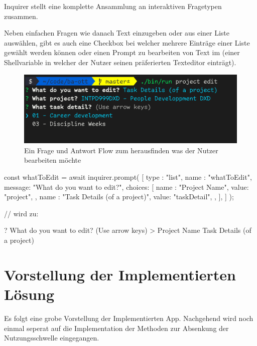 \documentclass[oneside,bibliography=totocnumbered,BCOR=5mm]{scrbook}
\newenvironment{code}{\captionsetup{type=listing, skip=0pt}}{}
\begin{document}
Inquirer stellt eine komplette Ansammlung an interaktiven %
Fragetypen zusammen.

Neben einfachen Fragen wie danach Text einzugeben oder aus einer Liste
auswählen, gibt es auch eine Checkbox bei welcher mehrere Einträge einer
Liste gewählt werden können oder einen Prompt zu bearbeiten von Text im
 (einer Shellvariable in welcher der Nutzer seinen
präferierten Texteditor einträgt).

\begin{figure}
  \centering
  \includegraphics[scale=0.5]{inquirer-example.png}
  \caption{Ein Frage und Antwort Flow zum herausfinden was der Nutzer bearbeiten möchte}
  \label{fig:inquirer-example}
\end{figure}

\begin{code}
  \medskip
  \begin{javascriptcode}
const { whatToEdit } = await inquirer.prompt( [ {
  type   : "list",
  name   : "whatToEdit",
  message: "What do you want to edit?",
  choices: [
    {
      name : "Project Name",
      value: "project",
    },
    {
      name : "Task Details (of a project)",
      value: "taskDetail",
    },
  ],
} ] );

// wird zu:

? What do you want to edit? (Use arrow keys)
> Project Name
  Task Details (of a project)
  \end{javascriptcode}
\end{code}

\section{Vorstellung der Implementierten Lösung}


Es folgt eine grobe Vorstellung der Implementierten App. Nachgehend wird
noch einmal seperat auf die Implementation der Methoden zur Absenkung der
Nutzungsschwelle eingegangen.
\end{document}
